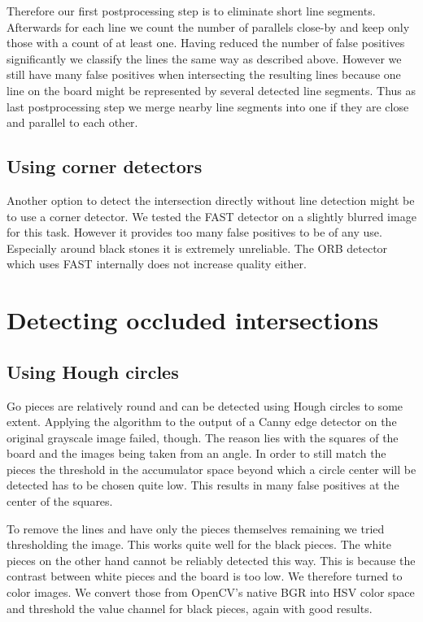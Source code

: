 	Therefore our first postprocessing step is to eliminate short line segments. Afterwards for each line we count the number of parallels close-by and keep only those with a count of at least one. Having reduced the number of false positives significantly we classify the lines the same way as described above. However we still have many false positives when intersecting the resulting lines because one line on the board might be represented by several detected line segments. Thus as last postprocessing step we merge nearby line segments into one if they are close and parallel to each other.

	\subsection{Using corner detectors}
	\label{detector-visible-corners}
	Another option to detect the intersection directly without line detection might be to use a corner detector. We tested the FAST \cite{} detector on a slightly blurred image for this task. However it provides too many false positives to be of any use. Especially around black stones it is extremely unreliable. The ORB detector which uses FAST internally does not increase quality either.

	\section{Detecting occluded intersections}
	\subsection{Using Hough circles}
	\label{detector-occluded-hough}
	Go pieces are relatively round and can be detected using Hough circles to some extent. Applying the algorithm to the output of a Canny edge detector on the original grayscale image failed, though. The reason lies with the squares of the board and the images being taken from an angle. In order to still match the pieces the threshold in the accumulator space beyond which a circle center will be detected has to be chosen quite low. This results in many false positives at the center of the squares.

	To remove the lines and have only the pieces themselves remaining we tried thresholding the image. This works quite well for the black pieces. The white pieces on the other hand cannot be reliably detected this way. This is because the contrast between white pieces and the board is too low. We therefore turned to color images. We convert those from OpenCV's native BGR into HSV color space and threshold the value channel for black pieces, again with good results.

